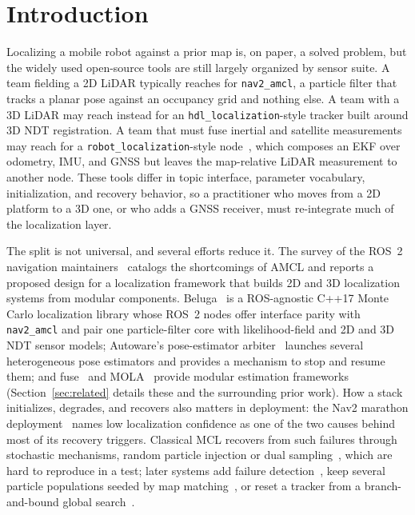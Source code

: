 \section{Introduction}\label{sec:intro}

Localizing a mobile robot against a prior map is, on paper, a solved
problem, but the widely used open-source tools are still largely
organized by sensor suite. A team fielding a 2D LiDAR typically reaches
for \texttt{nav2\_amcl}, a particle filter that tracks a planar pose
against an occupancy grid and nothing else. A team with a 3D LiDAR may
reach instead for an \texttt{hdl\_localization}-style tracker built
around 3D NDT registration. A team that must fuse inertial and
satellite measurements may reach for a
\texttt{robot\_localization}-style node~\cite{moore2014generalized},
which composes an EKF over odometry, IMU, and GNSS but leaves the
map-relative LiDAR measurement to another node. These tools differ in
topic interface, parameter vocabulary, initialization, and recovery
behavior, so a practitioner who moves from a 2D platform to a 3D one,
or who adds a GNSS receiver, must re-integrate much of the localization
layer.

The split is not universal, and several efforts reduce it. The survey
of the ROS~2 navigation maintainers~\cite{macenski2023survey} catalogs
the shortcomings of AMCL and reports a proposed design for a
localization framework that builds 2D and 3D localization systems from
modular components. Beluga~\cite{puga2024beluga,ekumen2022belugarepo}
is a ROS-agnostic C++17 Monte Carlo localization library whose ROS~2
nodes offer interface parity with \texttt{nav2\_amcl} and pair one
particle-filter core with likelihood-field and 2D and 3D NDT sensor
models; Autoware's pose-estimator arbiter~\cite{autoware2024arbiter}
launches several heterogeneous pose estimators and provides a mechanism
to stop and resume them; and fuse~\cite{locus2018fuse} and
MOLA~\cite{blancoclaraco2025mola} provide modular estimation frameworks
(Section~\ref{sec:related} details these and the surrounding prior
work). How a stack initializes, degrades, and recovers also matters in
deployment: the Nav2 marathon deployment~\cite{macenski2020marathon}
names low localization confidence as one of the two causes behind most
of its recovery triggers. Classical MCL recovers from such failures
through stochastic mechanisms, random particle injection or dual
sampling~\cite{fox1999efficient,thrun2001robust}, which are hard to
reproduce in a test; later systems add failure
detection~\cite{akai2023reliable}, keep several particle populations
seeded by map matching~\cite{garcia2023mhamcl}, or reset a tracker from
a branch-and-bound global search~\cite{koide2021hdlgl,sasaki2026globalloc}.

